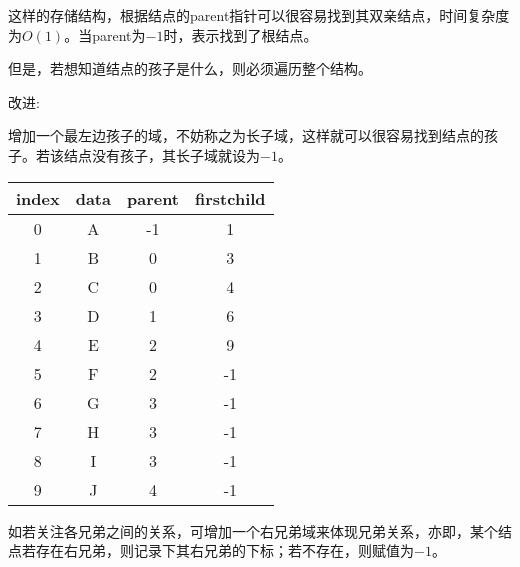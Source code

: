 \begin{frame}
这样的存储结构，根据结点的parent指针可以很容易找到其双亲结点，时间复杂度为$O(1)$。当parent为$-1$时，表示找到了根结点。 \vspace{0.2in}

但是，若想知道结点的孩子是什么，则必须遍历整个结构。
\end{frame}
%
%
\begin{frame}
\textcolor{acolor3}{改进:}

增加一个最左边孩子的域，不妨称之为\textcolor{acolor3}{长子域}，这样就可以很容易找到结点的孩子。若该结点没有孩子，其长子域就设为$-1$。
\end{frame}
%
%
\begin{frame}
\begin{small}
\begin{minipage}[t]{0.45\textwidth}
\begin{figure}
\centering
        
\end{figure}
\end{minipage}
\begin{minipage}[t]{0.45\textwidth}
\begin{table}
\begin{tabular}{c|c|c|c}\hline
index & data & parent & firstchild\\\hline
0&A&-1&1\\
1&B&0 &3\\
2&C&0 &4\\
3&D&1 &6\\
4&E&2 &9\\
5&F&2 &-1\\
6&G&3 &-1\\
7&H&3 &-1\\
8&I&3 &-1\\
9&J&4 &-1\\\hline
\end{tabular}
\end{table}
\end{minipage}
\end{small}
\end{frame}
%
%
\begin{frame}
如若关注各兄弟之间的关系，可增加一个右兄弟域来体现兄弟关系，亦即，某个结点若存在右兄弟，则记录下其右兄弟的下标；若不存在，则赋值为$-1$。
\end{frame}

